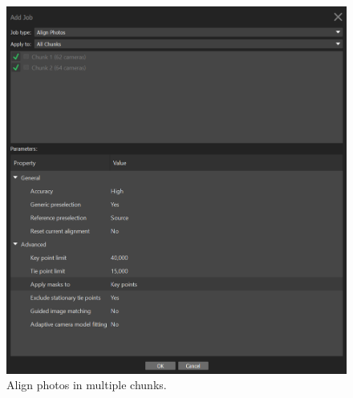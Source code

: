 \documentclass[
]{book}
\begin{document}
\begin{figure}

{\centering \includegraphics[width=0.8\linewidth]{Figures/metashape_batch_align} 

}

\caption{Align photos in multiple chunks.}\label{fig:batchalign}
\end{figure}
\end{document}
